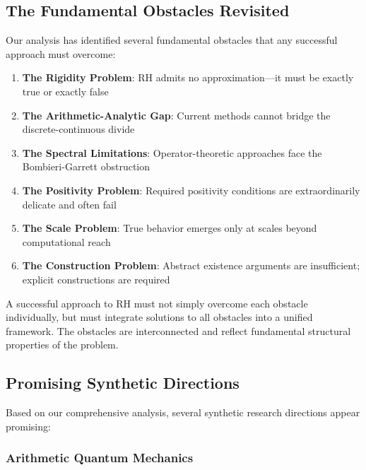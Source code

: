 \subsection{The Fundamental Obstacles Revisited}
\label{subsec:obstacles_revisited}

Our analysis has identified several fundamental obstacles that any successful approach must overcome:

\begin{enumerate}
\item \textbf{The Rigidity Problem}: RH admits no approximation—it must be exactly true or exactly false
\item \textbf{The Arithmetic-Analytic Gap}: Current methods cannot bridge the discrete-continuous divide
\item \textbf{The Spectral Limitations}: Operator-theoretic approaches face the Bombieri-Garrett obstruction
\item \textbf{The Positivity Problem}: Required positivity conditions are extraordinarily delicate and often fail
\item \textbf{The Scale Problem}: True behavior emerges only at scales beyond computational reach
\item \textbf{The Construction Problem}: Abstract existence arguments are insufficient; explicit constructions are required
\end{enumerate}

\begin{principle}
A successful approach to RH must not simply overcome each obstacle individually, but must integrate solutions to all obstacles into a unified framework. The obstacles are interconnected and reflect fundamental structural properties of the problem.
\end{principle}

\subsection{Promising Synthetic Directions}
\label{subsec:synthetic_directions}

Based on our comprehensive analysis, several synthetic research directions appear promising:

\subsubsection{Arithmetic Quantum Mechanics}
\label{subsubsec:arithmetic_quantum}

